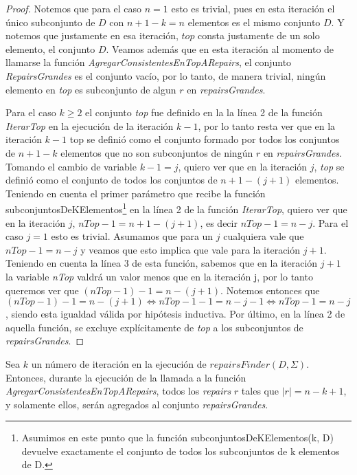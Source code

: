 \documentclass[11pt,a4paper,twoside]{tesis}
\begin{document}
\begin{proof}
Notemos que para el caso $n=1$ esto es trivial, pues en esta iteración el único subconjunto de $D$ con $n + 1 - k = n$ elementos es el mismo conjunto $D$. Y notemos que justamente en esa iteración, $top$ consta justamente de un solo elemento, el conjunto $D$. Veamos además que en esta iteración al momento de llamarse la función \textit{AgregarConsistentesEnTopARepairs}, el conjunto \textit{RepairsGrandes} es el conjunto vacío, por lo tanto, de manera trivial, ningún elemento en \textit{top} es subconjunto de algun $r$ en \textit{repairsGrandes}.

Para el caso $k \geq 2$ el conjunto \textit{top} fue definido en la la línea 2 de la función \textit{IterarTop} en la ejecución de la iteración $k-1$, por lo tanto resta ver que en la iteración $k-1$ top se definió como el conjunto formado por todos los conjuntos de $n + 1 - k$ elementos que no son subconjuntos de ningún $r$ en \textit{repairsGrandes}. Tomando el cambio de variable $k - 1 = j$, quiero ver que en la iteración $j$, \textit{top} se definió como el conjunto de  todos los conjuntos de $n + 1 - (j + 1)$ elementos. Teniendo en cuenta el primer parámetro que recibe la función subconjuntosDeKElementos\footnote{Asumimos en este punto que la función subconjuntosDeKElementos(k, D) devuelve exactamente el conjunto de todos los subconjuntos de k elementos de D.} en la línea 2 de la función \textit{IterarTop}, quiero ver que en la iteración $j$, $nTop-1=n + 1 - (j + 1)$, es decir $nTop-1=n-j$. Para el caso $j=1$ esto es trivial. Asumamos que para un $j$ cualquiera vale que $nTop-1=n-j$ y veamos que esto implica que vale para la iteración $j+1$. Teniendo en cuenta la línea 3 de esta función, sabemos que en la iteración $j+1$ la variable \textit{nTop} valdrá un valor menos que en la iteración j, por lo tanto queremos ver que $(nTop-1) - 1 = n - (j+1)$. Notemos entonces que $(nTop-1) - 1 = n - (j+1) \iff nTop-1 - 1 = n - j -1 \iff nTop-1 = n - j$, siendo esta igualdad válida por hipótesis inductiva.
Por último, en la línea 2 de aquella función, se excluye explícitamente de \textit{top} a los subconjuntos de \textit{repairsGrandes}.
\end{proof}

\begin{lemma}\label{repairs_grandes_agregados_en_iteracion_k}
Sea $k$ un número de iteración en la ejecución de $repairsFinder(D, \Sigma)$. Entonces, durante la ejecución de la llamada a la función \textit{AgregarConsistentesEnTopARepairs}, todos los \textit{repairs} $r$ tales que $|r| = n - k + 1$, y solamente ellos, serán agregados al conjunto \textit{repairsGrandes}. 
\end{lemma}
\end{document}
